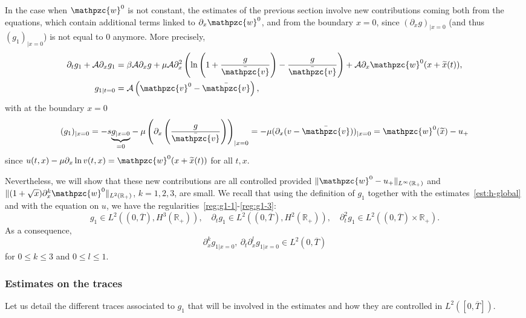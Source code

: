 \documentclass[AHL,Unicode,longabstracts,published]{cedram}
\newcommand{\R}{\mathbb{R}}
\newcommand{\p}{\partial}
\newcommand{\bv}{\bar{\mathpzc{v}}}
\newcommand{\cA}{\mathcal A}
\newcommand{\tv}{\mathpzc{v}}
\newcommand{\tw}{\mathpzc{w}}
\newcommand{\tx}{\widetilde{x}}
\newcommand{\tx}{\widetilde{x}}
\begin{document}
In the case when $\tw^0$ is not constant, the estimates of the previous section involve new contributions coming both from the equations, which contain additional terms linked to $\partial_x \tw^0$, and from the boundary $x=0$, since $(\partial_x g)_{|x=0}$ (and thus $(g_1)_{|x=0}$) is not equal to $0$ anymore. More precisely,
\begin{equation}\label{eq:g1-w0}
\begin{split}
\p_t g_1 + \cA \p_x g_1
&= \beta \cA \p_x g + \mu \cA \p_x^2\left(\ln\left(1+ \frac{g}{\bv}\right) - \frac{g}{\bv}\right) + \cA \partial_x \tw^0(x+ \tx(t)),\\
 g_{1|t=0} &=\cA\left(\tv^0-\bv\right),
\end{split}
\end{equation} 
with at the boundary $x=0$
\begin{equation}\label{eq:g1-x0}
(g_1)_{|x=0} = -s\underset{=0}{\underbrace{g_{|x=0}}} - \mu \left(\partial_x\left(\dfrac{g}{\bv}\right)\right)_{|x=0} = - \mu (\partial_x (v -\bv))_{|x=0} = \tw^0(\tx) -u_+
\end{equation}
since $u(t,x) - \mu \p_x \ln v(t,x)=\tw^0(x+\tx(t))$ for all $t,x$.


Nevertheless, we will show that these new contributions are all controlled provided $\|\tw^0 - u_+\|_{L^\infty(\R_+)}$ and $\|(1+\sqrt{x})\partial^k_x \tw^0\|_{L^2(\R_+)}$, $k=1,2,3$, are small. We recall that using the definition of $g_1$ together with the estimates~\eqref{est:h-global} and with the equation on $u$, we have the regularities~\eqref{reg:g1-1}-\eqref{reg:g1-3}:
\[
g_1\in L^2\left((0,\overline{T}), H^3(\R_+)\right),\quad \p_t g_1\in L^2\left((0,\overline{T}), H^2(\R_+)\right), \quad \p_t^2 g_1\in L^2\left((0,\overline{T})\times \R_+\right).
\]
As a consequence,
\[
\p_x^k g_{1|x=0},\ \p_t \p_x^l g_{1|x=0}\in L^2(0,\overline{T})
\]
for $0\leq k\leq 3$ and $0\leq l \leq 1$.

\subsubsection{Estimates on the traces} Let us detail the different traces associated to $g_1$ that will be involved in the estimates and how they are controlled in $L^2([0, \overline{T}])$.
\end{document}
